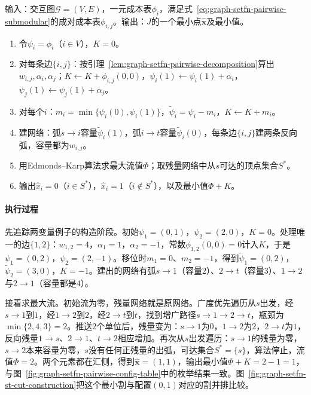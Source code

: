 \begin{algorithm}[成对二值函数的图割最小化]
\label{alg:graph-setfn-graph-cut}
输入：交互图$\mathcal G=(V,E)$，一元成本表$\phi_i$，满足式~\eqref{eq:graph-setfn-pairwise-submodular}的成对成本表$\phi_{i,j}$。输出：$J$的一个最小点$\hat{\bm x}$及最小值。
\begin{enumerate}
  \item 令$\psi_i=\phi_i$（$i\in V$），$K=0$。
  \item 对每条边$\{i,j\}$：按引理~\ref{lem:graph-setfn-pairwise-decomposition}算出$w_{i,j},\alpha_i,\alpha_j$；$K\gets K+\phi_{i,j}(0,0)$，$\psi_i(1)\gets\psi_i(1)+\alpha_i$，$\psi_j(1)\gets\psi_j(1)+\alpha_j$。
  \item 对每个$i$：$m_i=\min\{\psi_i(0),\psi_i(1)\}$，$\tilde\psi_i=\psi_i-m_i$，$K\gets K+m_i$。
  \item 建网络：弧$s\to i$容量$\tilde\psi_i(1)$，弧$i\to t$容量$\tilde\psi_i(0)$，每条边$\{i,j\}$建两条反向弧，容量都为$w_{i,j}$。
  \item 用Edmonds--Karp算法求最大流值$\Phi$；取残量网络中从$s$可达的顶点集合$S^\ast$。
  \item 输出$\hat x_i=0$（$i\in S^\ast$），$\hat x_i=1$（$i\notin S^\ast$），以及最小值$\Phi+K$。
\end{enumerate}
\end{algorithm}

\paragraph{执行过程}
先追踪两变量例子的构造阶段。初始$\psi_1=(0,1)$，$\psi_2=(2,0)$，$K=0$。处理唯一的边$\{1,2\}$：$w_{1,2}=4$，$\alpha_1=1$，$\alpha_2=-1$，常数$\phi_{1,2}(0,0)=0$计入$K$，于是$\psi_1=(0,2)$，$\psi_2=(2,-1)$。移位时$m_1=0$、$m_2=-1$，得到$\tilde\psi_1=(0,2)$，$\tilde\psi_2=(3,0)$，$K=-1$。建出的网络有弧$s\to1$（容量$2$）、$2\to t$（容量$3$）、$1\to2$与$2\to1$（容量都是$4$）。

接着求最大流。初始流为零，残量网络就是原网络。广度优先遍历从$s$出发，经$s\to1$到$1$，经$1\to2$到$2$，经$2\to t$到$t$，找到增广路径$s\to1\to2\to t$，瓶颈为$\min\{2,4,3\}=2$。推送$2$个单位后，残量变为：$s\to1$为$0$，$1\to2$为$2$，$2\to t$为$1$，反向残量$1\to s$、$2\to1$、$t\to2$相应增加。再次从$s$出发遍历：$s\to1$的残量为零，$s\to2$本来容量为零，$s$没有任何正残量的出弧，可达集合$S^\ast=\{s\}$，算法停止，流值$\Phi=2$。两个元素都在汇侧，得到$\hat{\bm x}=(1,1)$，输出最小值$\Phi+K=2-1=1$，与图~\ref{fig:graph-setfn-pairwise-config-table}中的枚举结果一致。图~\ref{fig:graph-setfn-st-cut-construction}把这个最小割与配置$(0,1)$对应的割并排比较。

